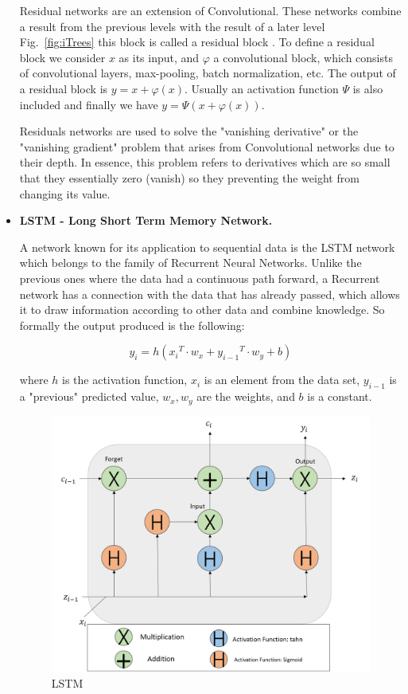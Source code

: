 \documentclass[a4paper,12pt]{report}
\theoremstyle{definitionNODot}
\begin{document}
\begin{itemize}
		Residual networks are an extension of Convolutional. These networks combine a result from the previous levels with the result of a later level Fig.~\ref{fig:iTrees} this block is called a residual block \cite{HeZhangRen2015Residual}. To define a residual block we consider $x$ as its input, and $\varphi$ a convolutional block, which consists of convolutional layers, max-pooling, batch normalization, etc. The output of a residual block is $y=x+ \varphi(x)$. Usually an activation function $\varPsi$ is also included and finally we have $y=\varPsi(x+\varphi(x))$.
		
		Residuals networks are used to solve the "vanishing derivative" or the "vanishing gradient" problem that arises from Convolutional networks due to their depth. In essence, this problem refers to derivatives which are so small that they essentially zero (vanish) so they preventing the weight from changing its value.
		
		\item \textbf{LSTM - Long Short Term Memory Network.}
		
		A network known for its application to sequential data is the LSTM network which belongs to the family of Recurrent Neural Networks. Unlike the previous ones where the data had a continuous path forward, a Recurrent network has a connection with the data that has already passed, which allows it to draw information according to other data and combine knowledge. So formally the output produced is the following:
		
		$$ y_i = h({x_i}^T \cdot {w_x} + {y_{i-1}}^T\cdot {w_y} + b)$$
		
		where $h$ is the activation function, $x_i$ is an element from the data set, $y_{i-1}$ is a "previous" predicted value, $w_x, w_y$ are the weights, and $b$ is a constant.
		
		\begin{figure}[h]
			\centering
			\includegraphics[width=\textwidth]{lstmarchitecture2.png}
			\caption{LSTM}
			\label{fig:lstmarchitecture}
		\end{figure}
		

\end{itemize}
\end{document}
